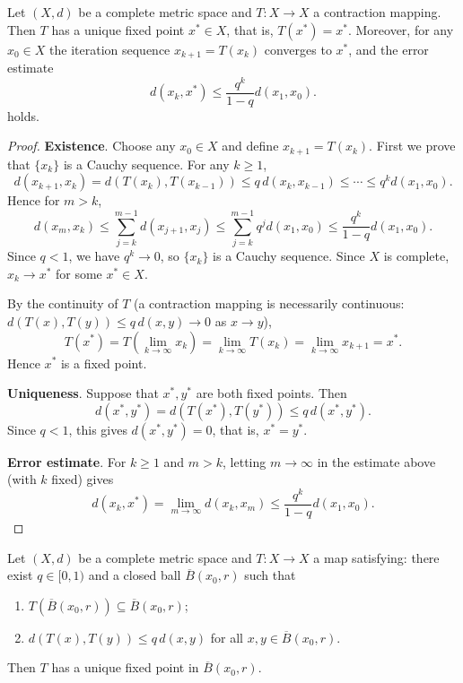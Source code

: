 \begin{theorem}\label{thm:banach_fixed_point}
Let $(X, d)$ be a complete metric space and $T: X \to X$ a contraction mapping. Then $T$ has a unique fixed point $x^* \in X$, that is, $T(x^*) = x^*$. Moreover, for any $x_0 \in X$ the iteration sequence $x_{k+1} = T(x_k)$ converges to $x^*$, and the error estimate
\[
d(x_k, x^*) \le \frac{q^k}{1 - q} d(x_1, x_0).
\]
holds.
\end{theorem}

\begin{proof}
\textbf{Existence}. Choose any $x_0 \in X$ and define $x_{k+1} = T(x_k)$. First we prove that $\{x_k\}$ is a Cauchy sequence. For any $k \ge 1$,
\[
d(x_{k+1}, x_k) = d(T(x_k), T(x_{k-1})) \le q \, d(x_k, x_{k-1}) \le \cdots \le q^k d(x_1, x_0).
\]
Hence for $m > k$,
\[
d(x_m, x_k) \le \sum_{j=k}^{m-1} d(x_{j+1}, x_j) \le \sum_{j=k}^{m-1} q^j d(x_1, x_0) \le \frac{q^k}{1 - q} d(x_1, x_0).
\]
Since $q < 1$, we have $q^k \to 0$, so $\{x_k\}$ is a Cauchy sequence. Since $X$ is complete, $x_k \to x^*$ for some $x^* \in X$.

By the continuity of $T$ (a contraction mapping is necessarily continuous: $d(T(x), T(y)) \le q \, d(x, y) \to 0$ as $x \to y$),
\[
T(x^*) = T\left( \lim_{k \to \infty} x_k \right) = \lim_{k \to \infty} T(x_k) = \lim_{k \to \infty} x_{k+1} = x^*.
\]
Hence $x^*$ is a fixed point.

\textbf{Uniqueness}. Suppose that $x^*, y^*$ are both fixed points. Then
\[
d(x^*, y^*) = d(T(x^*), T(y^*)) \le q \, d(x^*, y^*).
\]
Since $q < 1$, this gives $d(x^*, y^*) = 0$, that is, $x^* = y^*$.

\textbf{Error estimate}. For $k \ge 1$ and $m > k$, letting $m \to \infty$ in the estimate above (with $k$ fixed) gives
\[
d(x_k, x^*) = \lim_{m \to \infty} d(x_k, x_m) \le \frac{q^k}{1 - q} d(x_1, x_0).
\]
\end{proof}

\begin{corollary}\label{cor:banach_local}
Let $(X, d)$ be a complete metric space and $T: X \to X$ a map satisfying: there exist $q \in [0, 1)$ and a closed ball $\overline{B}(x_0, r)$ such that
\begin{enumerate}[label=(\roman*)]
    \item $T(\overline{B}(x_0, r)) \subseteq \overline{B}(x_0, r)$;
    \item $d(T(x), T(y)) \le q \, d(x, y)$ for all $x, y \in \overline{B}(x_0, r)$.
\end{enumerate}
Then $T$ has a unique fixed point in $\overline{B}(x_0, r)$.
\end{corollary}

